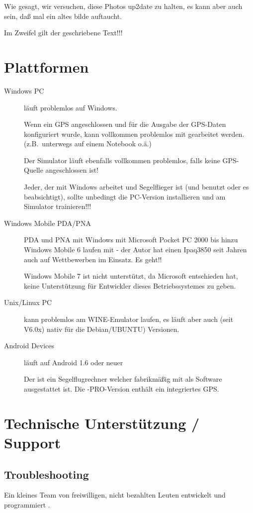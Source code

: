 Wie gesagt, wir versuchen, diese Photos up2date zu halten, es kann aber auch sein, daß mal ein altes bilde auftaucht.

Im Zweifel gilt der geschriebene Text!!!

\section{Plattformen}
\begin{description}
\item[Windows PC]
\xc läuft problemlos auf Windows.

Wenn ein GPS angeschlossen und für die Ausgabe der GPS-Daten konfiguriert wurde, kann vollkommen problemlos mit \xc gearbeitet 
werden.  (z.B.\ unterwegs auf einem Notebook o.ä.)

Der Simulator läuft ebenfalls vollkommen problemlos, falls keine GPS-Quelle angeschlossen ist!

Jeder, der mit Windows arbeitet und Segelflieger ist (und \xc benutzt oder es beabsichtigt), sollte unbedingt die 
PC-Version installieren und am Simulator trainieren!!! 
\item[Windows Mobile PDA/PNA]
PDA und PNA mit Windows mit Microsoft Pocket PC 2000 bis hinzu Windows Mobile 6 laufen mit \xc - der Autor hat einen Ipaq3850 seit Jahren 
auch auf Wettbewerben im Einsatz. Es geht!!

Windows Mobile 7 ist nicht unterstützt, da Microsoft entschieden hat, keine Unterstützung für Entwickler dieses 
Betriebssystemes zu geben.
\item[Unix/Linux PC]
\xc kann problemlos am WINE-Emulator laufen, es läuft aber auch (seit V6.0x) nativ für die Debian/UBUNTU) Versionen.
\item[Android Devices] \xc läuft auf Android 1.6 oder neuer 
\item[\al] Der \al ist ein Segelflugrechner welcher fabrikmäßig mit \xc als Software ausgestattet ist. 
Die \al-PRO-Version enthält ein integriertes GPS.
\end{description}


\section{Technische Unterstützung / Support}

\subsection*{Troubleshooting}
Ein kleines Team von freiwilligen, nicht bezahlten Leuten entwickelt und programmiert \xc. 

